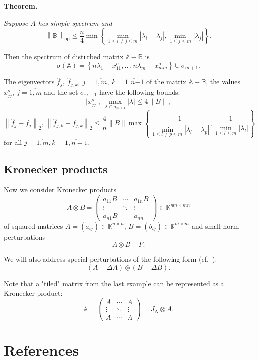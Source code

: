 \documentclass[a4paper]{jpconf}
\begin{document}
\textbf{Theorem.}
{\it
Suppose \( A \) has simple spectrum and
\[
    \left\| \mathbb{B} \right\|_{\mathrm{op}}
        \leq 
        \frac{n}{4}
         \min\left\{
             \min\limits_{1\leq i{\neq}j \leq m }{|\lambda_i - \lambda_j|},
             \min\limits_{1\leq j \leq m}{|\lambda_j|}
         \right\}.
 \]

Then the spectrum of disturbed matrix \( \mathbb{A} - \mathbb{B} \) is
\[
    \sigma\left(\mathbb{A}\right) =
        \left\{
            n\lambda_1 - x_{11}^o, \ldots, n\lambda_m - x_{mm}^o
        \right\}
    \cup \sigma_{m{+}1}.
\]

The eigenvectors
    \( \hat{f}_j,\ \hat{f}_{j,k},\ j{=}\overline{1,m},\ k{=}\overline{1,n{-1}} \)
    of the matrix \( \mathbb{A}{-}\mathbb{B} \),
    the values \( x_{jj}^o,\ j{=}\overline{1,m} \)
    and the set \( \sigma_{m{+}1} \) have the following bounds:
\[
    \lvert x_{jj}^o\rvert,
    \ \max_{\lambda\in\sigma_{m{+}1}} \lvert\lambda\rvert
    \leq 4\|B\|,
\]
\[
    \left\| \hat{f}_j - f_j \right\|_2,
    \ \left\| \hat{f}_{j,k} - f_{j,k}\right\|_2
    \leq
    \frac4n \|B\|
         \max\left\{
         \frac{1}{
             \min\limits_{1\leq l{\neq}p \leq m }{|\lambda_l - \lambda_p|}},
         \frac{1}{
             \min\limits_{1\leq l \leq m}{|\lambda_l|}}
         \right\}
\]
for all \( j{=}\overline{1,m}, k{=}\overline{1,n-1} \).
\/}

\subsection*{Kronecker products}

Now we consider Kronecker products
\[
    A\otimes B =
    \begin{pmatrix}
        a_{11} B & \cdots & a_{1n} B \\
        \vdots   & \ddots & \vdots \\
        a_{n1} B & \cdots & a_{nn}
    \end{pmatrix}
    \in \mathbb{K}^{{mn}{\times}{mn}}
\]
of squared matrices
\( A={(a_{ij})}\in\mathbb{K}^{n{\times}n},
 \ B={(b_{ij})}\in\mathbb{K}^{m{\times}m} \)
and small-norm perturbations
\[
    A\otimes B - F.
\]

We will also address special
    perturbations of the following form (cf.~\cite{XIANG2005210}):
\[
    (A-\Delta A)\otimes (B - \Delta B).
\]

Note that a "tiled" matrix from the last example
    can be represented as a Kronecker product:
\[
    \mathbb{A} =
    \begin{pmatrix}
    A & \cdots & A\\
    \vdots & \ddots & \vdots \\
    A & \cdots & A\end{pmatrix} =
        J_N\otimes A.
    \]

\section*{References}

{}
\end{document}
